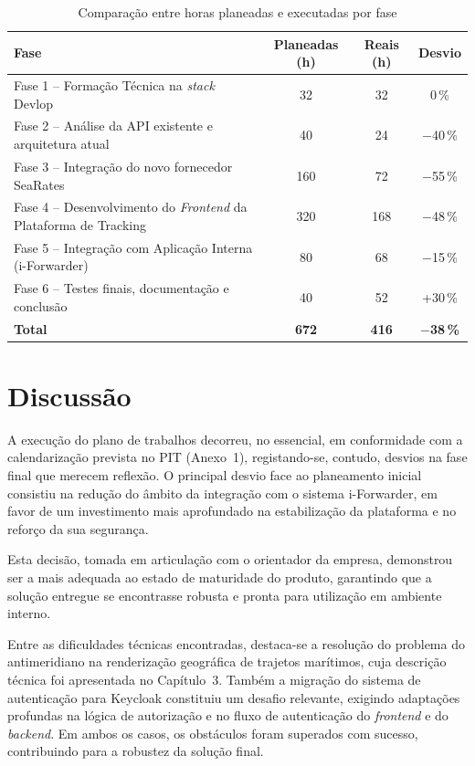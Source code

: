 \documentclass[a4paper,12pt]{report}
\begin{document}
\begin{table}[H]
\centering
\caption{Comparação entre horas planeadas e executadas por fase}
\label{tab:comparacao-horas}
\small
\begin{tabular}{|p{}|c|c|c|}
\hline
\textbf{Fase} & \textbf{Planeadas (h)} & \textbf{Reais (h)} & \textbf{Desvio} \\
\hline
Fase 1 -- Formação Técnica na \textit{stack} Devlop & 32 & 32 & 0\,\% \\
\hline
Fase 2 -- Análise da API existente e arquitetura atual & 40 & 24 & $-$40\,\% \\
\hline
Fase 3 -- Integração do novo fornecedor SeaRates & 160 & 72 & $-$55\,\% \\
\hline
Fase 4 -- Desenvolvimento do \textit{Frontend} da Plataforma de Tracking & 320 & 168 & $-$48\,\% \\
\hline
Fase 5 -- Integração com Aplicação Interna (i-Forwarder) & 80 & 68 & $-$15\,\% \\
\hline
Fase 6 -- Testes finais, documentação e conclusão & 40 & 52 & +30\,\% \\
\hline
\textbf{Total} & \textbf{672} & \textbf{416} & \textbf{$-$38\,\%} \\
\hline
\end{tabular}
\end{table}

\section{Discussão}

A execução do plano de trabalhos decorreu, no essencial, em conformidade com a calendarização prevista no PIT (Anexo~1), registando-se, contudo, desvios na fase final que merecem reflexão. O principal desvio face ao planeamento inicial consistiu na redução do âmbito da integração com o sistema i-Forwarder, em favor de um investimento mais aprofundado na estabilização da plataforma e no reforço da sua segurança.

Esta decisão, tomada em articulação com o orientador da empresa, demonstrou ser a mais adequada ao estado de maturidade do produto, garantindo que a solução entregue se encontrasse robusta e pronta para utilização em ambiente interno.

Entre as dificuldades técnicas encontradas, destaca-se a resolução do problema do antimeridiano na renderização geográfica de trajetos marítimos, cuja descrição técnica foi apresentada no Capítulo~3. Também a migração do sistema de autenticação para Keycloak constituiu um desafio relevante, exigindo adaptações profundas na lógica de autorização e no fluxo de autenticação do \textit{frontend} e do \textit{backend}. Em ambos os casos, os obstáculos foram superados com sucesso, contribuindo para a robustez da solução final.
\end{document}
